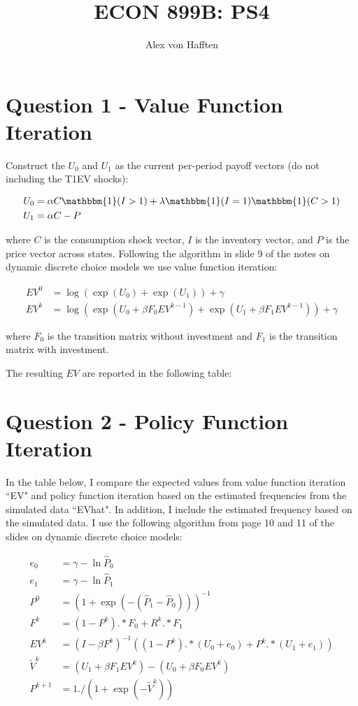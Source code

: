 \documentclass{article}
\title{ECON 899B: PS4}
\author{Alex von Hafften}
\newcommand{\onebf}{\mathbbm{1}}
\begin{document}
\maketitle

\section*{Question 1 - Value Function Iteration}

Construct the $U_0$ and $U_1$ as the current per-period payoff vectors (do not including the T1EV shocks):

\begin{align*}
U_0 &= \alpha C \onebf(I > 1) + \lambda\onebf(I = 1)\onebf(C > 1) \\
U_1 &= \alpha C - P
\end{align*}

where $C$ is the consumption shock vector, $I$ is the inventory vector, and $P$ is the price vector across states. Following the algorithm in slide 9 of the notes on dynamic discrete choice models we use value function iteration:

\begin{align*}
EV^0 &= \log (\exp(U_0) + \exp(U_1)) + \gamma \\
EV^k &= \log (\exp(U_0 + \beta F_0 EV^{k-1}) + \exp(U_1 + \beta F_1 EV^{k-1})) + \gamma
\end{align*}

where $F_0$ is the transition matrix without investment and $F_1$ is the transition matrix with investment. 

\bigskip

The resulting $EV$ are reported in the following table:


\pagebreak

\section*{Question 2 - Policy Function Iteration}

In the table below, I compare the expected values from value function iteration ``EV" and policy function iteration based on the estimated frequencies from the simulated data ``EVhat". In addition, I include the estimated frequency based on the simulated data. I use the following algorithm from page 10 and 11 of the slides on dynamic discrete choice models:

\begin{align*}
e_0 &= \gamma - \ln \hat{P}_0\\
e_1 &= \gamma - \ln \hat{P}_1\\
P^0 &= (1 + \exp(-(\hat{P}_1 -\hat{P}_0)))^{-1}\\
F^k &= (1-P^k) .*F_0 + R^k .* F_1 \\
EV^k &= (I - \beta F^k)^{-1} ((1-P^k) .* (U_0 + e_0) + P^k .* (U_1 + e_1))\\
\tilde{V}^k &= (U_1 + \beta F_1 EV^k) - (U_0 + \beta F_0 EV^k)\\
P^{k+1} &= 1./(1 + \exp(-\tilde{V}^k))
\end{align*}
\end{document}
